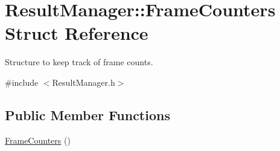 \hypertarget{struct_result_manager_1_1_frame_counters}{}\section{Result\+Manager\+:\+:Frame\+Counters Struct Reference}
\label{struct_result_manager_1_1_frame_counters}


Structure to keep track of frame counts.  




{\ttfamily \#include $<$Result\+Manager.\+h$>$}

\subsection*{Public Member Functions}
\begin{DoxyCompactItemize}
\item 
\hyperlink{struct_result_manager_1_1_frame_counters_a1297cf822a66ec485d2cc70ec801098a}{Frame\+Counters} ()
\end{DoxyCompactItemize}
